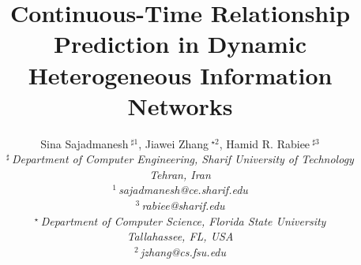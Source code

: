 \documentclass[10pt,conference,letterpaper]{IEEEtran}
\title{Continuous-Time Relationship Prediction in Dynamic Heterogeneous Information Networks}
\author{%
{Sina Sajadmanesh{\small $~^{\sharp1}$}, Jiawei Zhang{\small $~^{\star2}$}, Hamid R. Rabiee{\small $~^{\sharp3}$} }%
\vspace{1.6mm}\\
\fontsize{10}{10}\selectfont\itshape
$^{\sharp}$\,Department of Computer Engineering, Sharif University of Technology\\
Tehran, Iran\\
\fontsize{9}{9}\selectfont\ttfamily\upshape
%
$^{1}$\,sajadmanesh@ce.sharif.edu\\
$^{3}$\,rabiee@sharif.edu%
\vspace{1.2mm}\\
\fontsize{10}{10}\selectfont\rmfamily\itshape
$^{\star}$\,Department of Computer Science, Florida State University\\
Tallahassee, FL, USA\\
\fontsize{9}{9}\selectfont\ttfamily\upshape
$^{2}$\,jzhang@cs.fsu.edu
}
\begin{document}
\maketitle
%
\newtheorem{definition}{Definition}
\newcommand{\descr}[1]{\smallskip\noindent\textbf{#1}}
\newcommand{\npglm}{{\textsc{Np-Glm}}\xspace}
\newcommand\xrsquigarrow[1]{%
	\stepcounter{sarrow}%
	\begin{tikzpicture}[decoration=snake]
	\node (\thesarrow) {\strut#1};
	\draw[->,decorate] (\thesarrow.south west) -- (\thesarrow.south east);
	\end{tikzpicture}%
}









%
%


\balance

\end{document}
